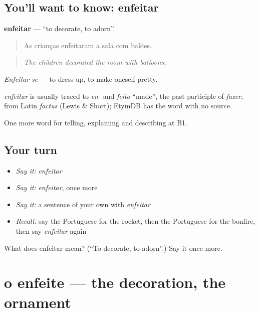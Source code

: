 \subsection*{You'll want to know: enfeitar}
\textbf{enfeitar} — \textquotedblleft{}to decorate, to adorn\textquotedblright{}.

\begin{quote}
As crianças enfeitaram a sala com balões.
\end{quote}

\begin{quote}
\emph{The children decorated the room with balloons.}
\end{quote}

\emph{Enfeitar-se} — to dress up, to make oneself pretty.

\begin{cousinweb}
\emph{enfeitar} is usually traced to \emph{en-} and \emph{feito} \textquotedblleft{}made\textquotedblright{}, the past participle of \emph{fazer}, from Latin \emph{factus} (Lewis \& Short); EtymDB has the word with no source.
\end{cousinweb}

\begin{grammarlens}[title={What you've built}]
One more word for telling, explaining and describing at B1.
\end{grammarlens}

\subsection*{Your turn}
\begin{itemize}
\raggedright
  \item \emph{Say it:} \emph{enfeitar}
  \item \emph{Say it:} \emph{enfeitar}, once more
  \item \emph{Say it:} a sentence of your own with \emph{enfeitar}
  \item \emph{Recall:} say the Portuguese for the rocket, then the Portuguese for the bonfire, then say \emph{enfeitar} again
\end{itemize}

\begin{tcolorbox}[breakable,colback=teal!4,colframe=teal!35!black,title={Before you move on}]
What does enfeitar mean? (\textquotedblleft{}To decorate, to adorn\textquotedblright{}.) Say it once more.
\end{tcolorbox}
\section[o enfeite]{o enfeite — the decoration, the ornament}

